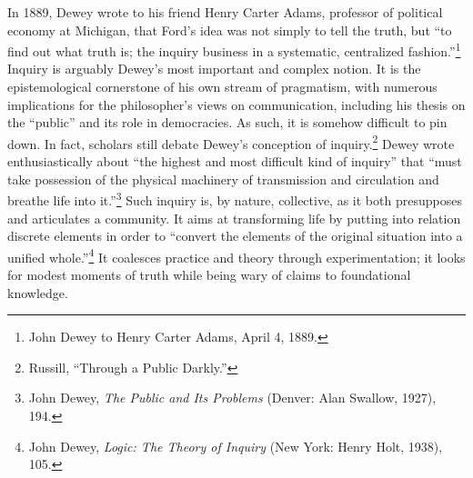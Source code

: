\documentclass[openany,nobib]{tufte-book}
\begin{document}
\newpage In 1889, Dewey wrote to his friend Henry Carter Adams, professor of
political economy at Michigan, that Ford's idea was not simply to tell
the truth, but ``to find out what truth is; the inquiry business in a
systematic, centralized fashion.''\footnote{John Dewey to Henry Carter
  Adams, April 4, 1889.} Inquiry is arguably Dewey's most important and
complex notion. It is the epistemological cornerstone of his own stream
of pragmatism, with numerous implications for the philosopher's views on
communication, including his thesis on the ``public'' and its role in
democracies. As such, it is somehow difficult to pin down. In fact,
scholars still debate Dewey's conception of inquiry.\footnote{Russill,
  ``Through a Public Darkly.''} Dewey wrote enthusiastically about ``the
highest and most difficult kind of inquiry'' that ``must take possession
of the physical machinery of transmission and circulation and breathe
life into it.''\footnote{John Dewey, \emph{The Public and Its Problems}
  (Denver: Alan Swallow, 1927), 194.} Such inquiry is, by nature,
collective, as it both presupposes and articulates a community. It aims
at transforming life by putting into relation discrete elements in order
to ``convert the elements of the original situation into a unified
whole.''\footnote{John Dewey, \emph{Logic: The Theory of Inquiry} (New
  York: Henry Holt, 1938), 105.} It coalesces practice and theory
through experimentation; it looks for modest moments of truth while
being wary of claims to foundational knowledge.
\end{document}
